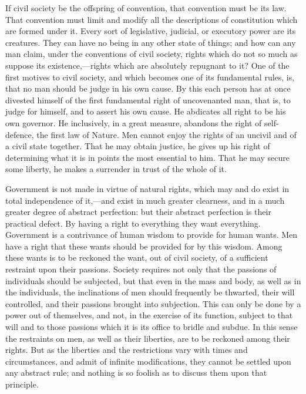 If civil society be the offspring of convention, that convention must be its law. That convention must limit and modify all the descriptions of constitution which are formed under it. Every sort of legislative, judicial, or executory power are its creatures. They can have no being in any other state of things; and how can any man claim, under the conventions of civil society, rights which do not so much as suppose its existence,—rights which are absolutely repugnant to it? One of the first motives to civil society, and which becomes one of its fundamental rules, is, that no man should be judge in his own cause. By this each person has at once divested himself of the first fundamental right of uncovenanted man, that is, to judge for himself, and to assert his own cause. He abdicates all right to be his own governor. He inclusively, in a great measure, abandons the right of self-defence, the first law of Nature. Men cannot enjoy the rights of an uncivil and of a civil state together. That he may obtain justice, he gives up his right of determining what it is in points the most essential to him. That he may secure some liberty, he makes a surrender in trust of the whole of it.

Government is not made in virtue of natural rights, which may and do exist in total independence of it,—and exist in much greater clearness, and in a much greater degree of abstract perfection: but their abstract perfection is their practical defect. By having a right to everything they want everything. Government is a contrivance of human wisdom to provide for human wants. Men have a right that these wants should be provided for by this wisdom. Among these wants is to be reckoned the want, out of civil society, of a sufficient restraint upon their passions. Society requires not only that the passions of individuals should be subjected, but that even in the mass and body, as well as in the individuals, the inclinations of men should frequently be thwarted, their will controlled, and their passions brought into subjection. This can only be done by a power out of themselves, and not, in the exercise of its function, subject to that will and to those passions which it is its office to bridle and subdue. In this sense the restraints on men, as well as their liberties, are to be reckoned among their rights. But as the liberties and the restrictions vary with times and circumstances, and admit of infinite modifications, they cannot be settled upon any abstract rule; and nothing is so foolish as to discuss them upon that principle.

